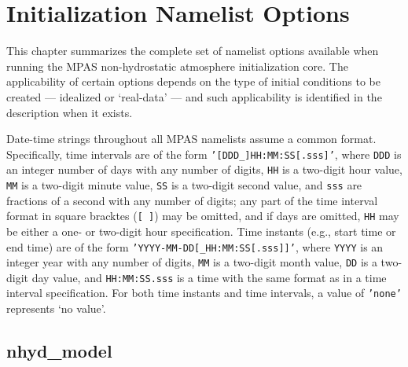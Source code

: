 
\chapter{Initialization Namelist Options}
\label{chap:init_atm_namelist}

This chapter summarizes the complete set of namelist options available when
running the MPAS non-hydrostatic atmosphere initialization core.  The
applicability of certain options depends on the type of initial conditions to be
created --- idealized or `real-data' --- and such applicability is identified in
the description when it exists.

Date-time strings throughout all MPAS namelists assume a common format.
Specifically, time intervals are of the form {\tt '[DDD\_]HH:MM:SS[.sss]'},
where {\tt DDD} is an integer number of days with any number of digits, {\tt HH}
is a two-digit hour value, {\tt MM} is a two-digit minute value, {\tt SS} is a
two-digit second value, and {\tt sss} are fractions of a second with any number
of digits; any part of the time interval format in square bracktes ({\tt [ ]})
may be omitted, and if days are omitted, {\tt HH} may be either a one- or
two-digit hour specification.  Time instants (e.g., start time or end time) are
of the form {\tt 'YYYY-MM-DD[\_HH:MM:SS[.sss]]'}, where {\tt YYYY} is an integer
year with any number of digits, {\tt MM} is a two-digit month value, {\tt DD} is
a two-digit day value, and {\tt HH:MM:SS.sss} is a time with the same format as
in a time interval specification. For both time instants and time intervals, a
value of {\tt 'none'} represents `no value'.

\section{nhyd\_model}

